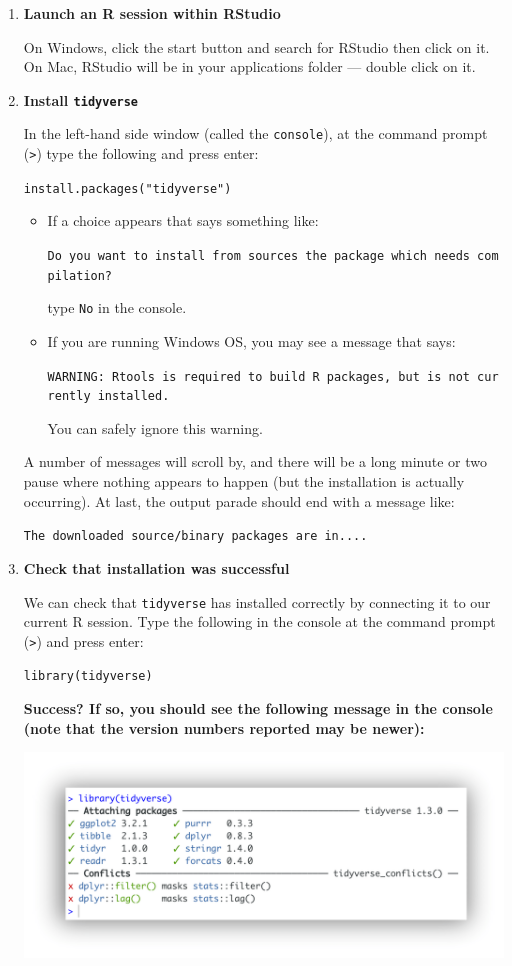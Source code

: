 \documentclass[
]{book}
\begin{document}
\begin{enumerate}
\def\labelenumi{\arabic{enumi}.}
\item
  \textbf{Launch an R session within RStudio}

  On Windows, click the start button and search for RStudio then click on it. On Mac,
  RStudio will be in your applications folder --- double click on it.
\item
  \textbf{Install \texttt{tidyverse}}

  In the left-hand side window (called the \texttt{console}), at the command prompt (\texttt{\textgreater{}}) type the following and press enter:

  \texttt{install.packages("tidyverse")}

  \begin{itemize}
  \item
    If a choice appears that says something like:

    \texttt{Do\ you\ want\ to\ install\ from\ sources\ the\ package\ which\ needs\ compilation?}

    type \texttt{No} in the console.
  \item
    If you are running Windows OS, you may see a message that says:

    \texttt{WARNING:\ Rtools\ is\ required\ to\ build\ R\ packages,\ but\ is\ not\ currently\ installed.}

    You can safely ignore this warning.
  \end{itemize}

  A number of messages will scroll by, and there will be a long minute or two
  pause where nothing appears to happen (but the installation is actually occurring).
  At last, the output parade should end with a message like:

  \texttt{The\ downloaded\ source/binary\ packages\ are\ in....}
\item
  \textbf{Check that installation was successful}

  We can check that \texttt{tidyverse} has installed correctly by connecting it to our current R session.
  Type the following in the console at the command prompt (\texttt{\textgreater{}}) and press enter:

  \texttt{library(tidyverse)}

  \textbf{Success? If so, you should see the following message in the console (note that the version numbers reported may be newer):}

  \includegraphics{R/Rinstall/images/tidyverse_install.png}


\end{enumerate}
\end{document}
